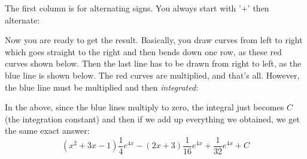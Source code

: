 \documentclass[12pt]{report}
\begin{document}
\begin{appendices}
	\begin{center}  \end{center}
	The first column is for alternating signs. You always start with '+' then alternate:
	\begin{center}  \end{center}
	Now you are ready to get the result. Basically, you draw curves from left to right which goes straight to the right and then bends down one row, as these red curves shown below. Then the last line has to be drawn from right to left, as the blue line is shown below. The red curves are multiplied, and that's all. However, the blue line must be multiplied and then \textit{integrated}:
	\begin{center}  \end{center}
	In the above, since the blue lines multiply to zero, the integral just becomes $C$ (the integration constant) and then if we add up everything we obtained, we get the same exact answer:
	$$ (x^2+3x-1)\frac{1}{4} e^{4x}-(2x+3)\frac{1}{16} e^{4x}+\frac{1}{32} e^{4x} +C$$
	

\end{appendices}
\end{document}
